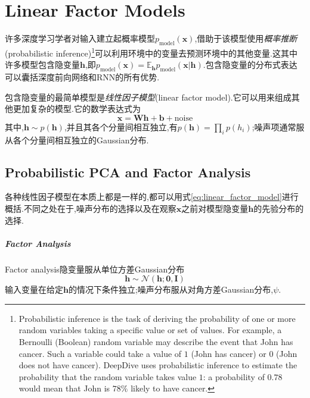 \chapter{Linear Factor Models}

许多深度学习学者对输入建立起概率模型$p_{\text{model}}(\mathbf x)$,借助于该模型使用\textit{概率推断}(probabilistic inference)\footnote{Probabilistic inference is the task of deriving the probability of one or more random variables taking a specific value or set of values. For example, a Bernoulli (Boolean) random variable may describe the event that John has cancer. Such a variable could take a value of $1$ (John has cancer) or $0$ (John does not have cancer). DeepDive uses probabilistic inference to estimate the probability that the random variable takes value $1$: a probability of $0.78$ would mean that John is $78\%$ likely to have cancer.}可以利用环境中的变量去预测环境中的其他变量.这其中许多模型包含隐变量$\mathbf h$,即$p_{\text{model}}(\mathbf x)=\mathbb E_{\mathbf h}p_{\text{model}}(\mathbf x|\mathbf h)$.包含隐变量的分布式表达可以囊括深度前向网络和RNN的所有优势.

包含隐变量的最简单模型是\textit{线性因子模型}(linear factor model).它可以用来组成其他更加复杂的模型.它的数学表达式为
\begin{equation}\label{eq:linear_factor_model}
\mathbf x=\mathbf {Wh+b}+\text{noise}
\end{equation}
其中,$\mathbf h\sim p(\mathbf h)$,并且其各个分量间相互独立,有$p(\mathbf h)=\prod_ip(h_i)$;噪声项通常服从各个分量间相互独立的Gaussian分布.

\section{Probabilistic PCA and Factor Analysis}

各种线性因子模型在本质上都是一样的,都可以用式\ref{eq:linear_factor_model}进行概括.不同之处在于,噪声分布的选择以及在观察$\mathbf x$之前对模型隐变量$\mathbf h$的先验分布的选择.

\paragraph{Factor Analysis}

Factor analysis隐变量服从单位方差Gaussian分布
\begin{equation}
\mathbf h\sim\mathcal N(\mathbf{h;0,I})
\end{equation}
输入变量在给定$\mathbf h$的情况下条件独立;噪声分布服从对角方差Gaussian分布,$\psi$.

